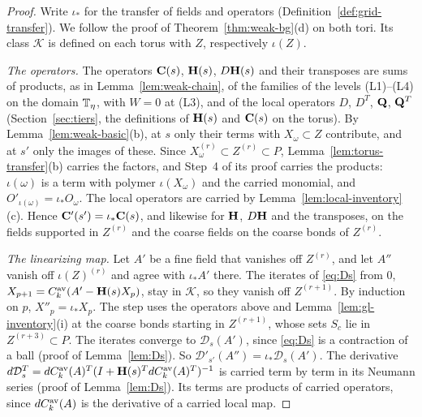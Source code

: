 \begin{proof}
Write $\iota_*$ for the transfer of fields and operators (Definition~\ref{def:grid-transfer}). We follow the proof of Theorem~\ref{thm:weak-bg}(d) on both tori. Its class $\mathcal K$ is defined on each torus with $Z$, respectively $\iota(Z)$.

\emph{The operators.} The operators $\mathbf C(s)$, $\mathbf H(s)$, $D\mathbf H(s)$ and their transposes are sums of products, as in Lemma~\ref{lem:weak-chain}, of the families of the levels (L1)--(L4) on the domain $\mathbb T_\eta$, with $W=0$ at (L3), and of the local operators $D$, $D^T$, $\mathbf Q$, $\mathbf Q^T$ (Section~\ref{sec:tiers}, the definitions of $\mathbf H(s)$ and $\mathbf C(s)$ on the torus). By Lemma~\ref{lem:weak-basic}(b), at $s$ only their terms with $X_\omega\subset Z$ contribute, and at $s'$ only the images of these. Since $X_\omega^{(r)}\subset Z^{(r)}\subset P$, Lemma~\ref{lem:torus-transfer}(b) carries the factors, and Step~4 of its proof carries the products: $\iota(\omega)$ is a term with polymer $\iota(X_\omega)$ and the carried monomial, and $O'_{\iota(\omega)}=\iota_*O_\omega$. The local operators are carried by Lemma~\ref{lem:local-inventory}(c). Hence $\mathbf C'(s')=\iota_*\mathbf C(s)$, and likewise for $\mathbf H$, $D\mathbf H$ and the transposes, on the fields supported in $Z^{(r)}$ and the coarse fields on the coarse bonds of $Z^{(r)}$.

\emph{The linearizing map.} Let $A'$ be a fine field that vanishes off $Z^{(r)}$, and let $A''$ vanish off $\iota(Z)^{(r)}$ and agree with $\iota_*A'$ there. The iterates of \eqref{eq:Ds} from $0$, $X_{p+1}=C^{\rm av}_k(A'-\mathbf H(s)X_p)$, stay in $\mathcal K$, so they vanish off $Z^{(r+1)}$. By induction on $p$, $X''_p=\iota_*X_p$. The step uses the operators above and Lemma~\ref{lem:gl-inventory}(i) at the coarse bonds starting in $Z^{(r+1)}$, whose sets $S_c$ lie in $Z^{(r+3)}\subset P$. The iterates converge to $\mathcal D_s(A')$, since \eqref{eq:Ds} is a contraction of a ball (proof of Lemma~\ref{lem:Ds}). So $\mathcal D'_{s'}(A'')=\iota_*\mathcal D_s(A')$. The derivative $d\mathcal D_s^T=dC^{\rm av}_k(A)^T(I+\mathbf H(s)^TdC^{\rm av}_k(A)^T)^{-1}$ is carried term by term in its Neumann series (proof of Lemma~\ref{lem:Ds}). Its terms are products of carried operators, since $dC^{\rm av}_k(A)$ is the derivative of a carried local map.


\end{proof}
